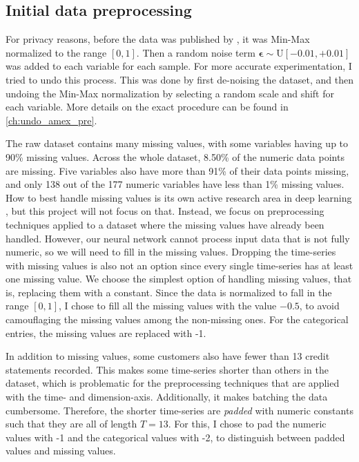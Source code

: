 \documentclass{statsmsc}
\begin{document}
{%

\subsection{Initial data preprocessing}%
\label{sub:Data formatting}

For privacy reasons, before the data was published by \cite{amex-data}, it was Min-Max
normalized to the range $[0, 1]$. Then a random noise term $\bm\epsilon \sim
\textrm{U}[-0.01,+0.01]$ was added to each variable for each sample.
For more accurate experimentation, I tried to undo this process. This was
done by first de-noising the dataset, and then undoing the Min-Max normalization by selecting
a random scale and shift for each variable. More details on the exact procedure can be found
in  \cref{ch:undo_amex_pre}.

The raw dataset contains many missing values, with some variables having up to 90\% missing
values.  Across the whole dataset, 8.50\% of the numeric data points are
missing. Five variables also have more than 91\% of their data points missing,
and only 138 out of the 177 numeric variables have less than 1\% missing
values. How to best handle missing values is its own active research area in deep learning
\citep{weerakody2023,brits}, but this project will not focus on that.  Instead, we
focus on preprocessing techniques applied to a dataset where the missing values
have already been handled. However, our neural network cannot process input
data that is not fully numeric, so we will need to fill in the missing values.
Dropping the time-series with missing values is also not an option
since every single time-series has at least one missing value. We choose the simplest
option of handling missing values, that is, replacing them with a constant.
Since the data is normalized to fall in the range
$[0,1]$, I chose to fill all the missing values with the value $-0.5$, to avoid
camouflaging the missing values among the non-missing ones.
For the categorical entries, the missing values are replaced with -1.

In addition to missing values, some customers also have fewer than 13 credit
statements recorded. This makes some time-series shorter than others in the
dataset, which is problematic for the preprocessing techniques that are applied
with the time- and dimension-axis.  Additionally, it makes batching the data
cumbersome. Therefore, the shorter time-series are \textit{padded} with numeric
constants such that they are all of length $T=13$. For this, I chose to pad the
numeric values with -1 and the categorical values with -2, to distinguish between
padded values and missing values.

}
\end{document}

